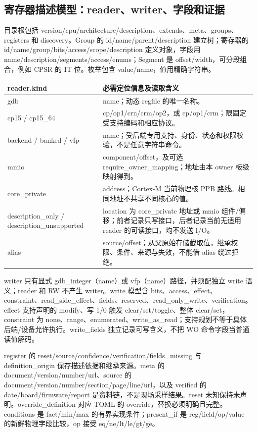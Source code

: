 \documentclass[UTF8,a4paper,11pt,oneside,fontset=none]{ctexart}
\begin{document}
\subsection{寄存器描述模型：reader、writer、字段和证据}
\label{sec:catalogue-schema-complete}
目录根包括 version/cpu/architecture/description、extends、meta、groups、registers 和 discovery。Group 的 id/name/parent/description 建立树；寄存器的 id/name/group/bits/access/scope/description 定义对象，字段用 name/description/segments/access/enums；Segment 是 offset/width，可分段组合，例如 CPSR 的 IT 位。枚举包含 value/name，值用精确字符串。

\begin{longtable}{@{}P{43mm}P{118mm}@{}}\toprule
reader.kind & 必需定位信息及读取含义\\\midrule\endhead
gdb & name；动态 regfile 的唯一名称。\\
cp15 / cp15\_64 & cp/op1/crn/crm/op2，或 cp/op1/crm；限固定受支持编码和相应协议。\\
backend / banked / vfp & name；受后端专用支持、身份、状态和权限校验，不是任意字符串命令。\\
mmio & component/offset，及可选 require\_owner\_mapping；地址由本 owner 板级映射得到。\\
core\_private & address；Cortex-M 当前物理核 PPB 路线。相同地址不共享不同核心的值。\\
description\_only / description\_unsupported & location 为 core\_private 地址或 mmio 组件/偏移；前者记录只写接口，后者记录当前无适用 reader 的可读接口，均不发送 I/O。\\
alias & source/offset；从父原始存储截取位，继承权限、条件、来源与失效，不能借 alias 绕过拒绝。\\\bottomrule
\end{longtable}
writer 只有显式 gdb\_integer（name）或 vfp（name）路径，并须配独立 write 语义；reader 和 RW 不产生 writer。write 模型含 bits、access、effect、constraint、read\_side\_effect、fields、reserved、read\_only\_write、verification。effect 支持声明的 modify、写 1/0 触发 clear/set/toggle、整体 clear/set，constraint 为 none、range、enumerated、write\_as\_read；支持规划不等于具体后端/设备允许执行。write\_fields 独立记录可写含义，不把 WO 命令字段当普通读值解码。

register 的 reset/source/confidence/verification/fields\_missing 与 definition\_origin 保存描述依据和继承来源。meta 的 document/version/number/url、source 的 document/version/number/section/page/line/url，以及 verified 的 date/board/firmware/report 是资料链，不是现场采样结果。reset 未知保持未声明。override\_definition 对应 TOML 的 override，替换必须明确且完整。conditions 是 fact/min/max 的有界实现条件；present\_if 是 reg/field/op/value 的新鲜物理字段比较，op 接受 eq/ne/lt/le/gt/ge。
\end{document}
